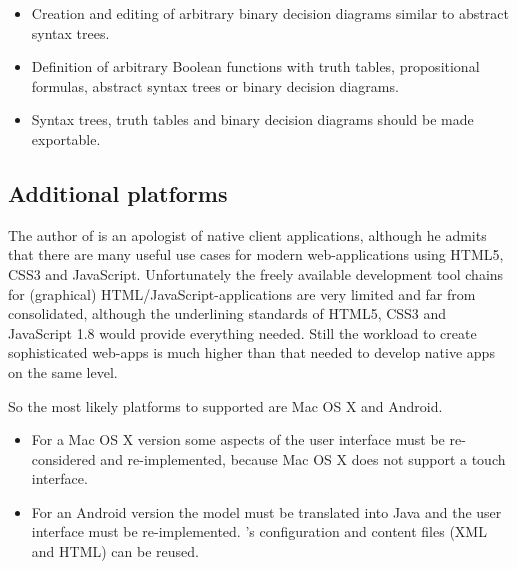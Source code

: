 \begin{itemize}

\item Creation and editing of arbitrary binary decision diagrams similar to abstract syntax trees.

\item Definition of arbitrary Boolean functions with truth tables, propositional formulas, abstract syntax trees or binary decision diagrams.

\item Syntax trees, truth tables and binary decision diagrams should be made exportable.

\end{itemize}


\subsection{Additional platforms}

The author of \Nyaya is an apologist of native client applications,
although he admits that there are many useful use cases for modern web-applications
using HTML5, CSS3 and JavaScript. 
Unfortunately the freely available development tool chains for (graphical) HTML/JavaScript-applications
are very limited and far from consolidated, although the underlining standards of HTML5, CSS3 
and JavaScript 1.8 would provide everything needed.
Still the workload to create sophisticated web-apps 
is much higher than that needed to develop native apps on the same level.

So the most likely platforms to supported \Nyaya are Mac OS X and Android.

\begin{itemize}
\item
For a Mac OS X version some aspects of the user interface must be re-considered and re-implemented, 
because Mac OS X does not support a touch interface.
\item
For an Android version the model must be translated into Java and the user interface must be re-implemented.
{\Nyaya}’s configuration and content files (XML and HTML) can be reused.
\end{itemize}
